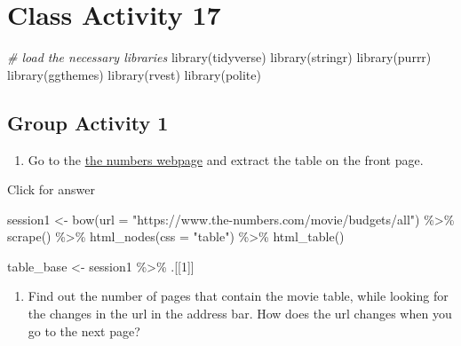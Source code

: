 \documentclass[
]{book}
\newenvironment{Shaded}{\begin{snugshade}}{\end{snugshade}}
\newcommand{\AttributeTok}[1]{\textcolor[rgb]{0.77,0.63,0.00}{#1}}
\newcommand{\CommentTok}[1]{\textcolor[rgb]{0.56,0.35,0.01}{\textit{#1}}}
\newcommand{\DecValTok}[1]{\textcolor[rgb]{0.00,0.00,0.81}{#1}}
\newcommand{\FunctionTok}[1]{\textcolor[rgb]{0.00,0.00,0.00}{#1}}
\newcommand{\NormalTok}[1]{#1}
\newcommand{\OtherTok}[1]{\textcolor[rgb]{0.56,0.35,0.01}{#1}}
\newcommand{\SpecialCharTok}[1]{\textcolor[rgb]{0.00,0.00,0.00}{#1}}
\newcommand{\StringTok}[1]{\textcolor[rgb]{0.31,0.60,0.02}{#1}}
\providecommand{\tightlist}{%
  \setlength{\itemsep}{0pt}\setlength{\parskip}{0pt}}
\begin{document}
\hypertarget{class-activity-17}{%
\chapter{Class Activity 17}\label{class-activity-17}}

\begin{Shaded}
\begin{Highlighting}[]
\CommentTok{\# load the necessary libraries}
\FunctionTok{library}\NormalTok{(tidyverse)}
\FunctionTok{library}\NormalTok{(stringr)}
\FunctionTok{library}\NormalTok{(purrr)}
\FunctionTok{library}\NormalTok{(ggthemes)}
\FunctionTok{library}\NormalTok{(rvest)}
\FunctionTok{library}\NormalTok{(polite)}
\end{Highlighting}
\end{Shaded}

\hypertarget{group-activity-1-4}{%
\section{Group Activity 1}\label{group-activity-1-4}}

\begin{enumerate}
\def\labelenumi{\arabic{enumi}.}
\tightlist
\item
  Go to the \href{https://www.the-numbers.com/movie/budgets/all}{the numbers webpage} and extract the table on the front page.
\end{enumerate}

Click for answer

\begin{Shaded}
\begin{Highlighting}[]
\NormalTok{session1 }\OtherTok{\textless{}{-}} \FunctionTok{bow}\NormalTok{(}\AttributeTok{url =} \StringTok{"https://www.the{-}numbers.com/movie/budgets/all"}\NormalTok{) }\SpecialCharTok{\%\textgreater{}\%} \FunctionTok{scrape}\NormalTok{() }\SpecialCharTok{\%\textgreater{}\%}
  \FunctionTok{html\_nodes}\NormalTok{(}\AttributeTok{css =} \StringTok{"table"}\NormalTok{) }\SpecialCharTok{\%\textgreater{}\%}
  \FunctionTok{html\_table}\NormalTok{()}

\NormalTok{table\_base }\OtherTok{\textless{}{-}}\NormalTok{ session1 }\SpecialCharTok{\%\textgreater{}\%}\NormalTok{ .[[}\DecValTok{1}\NormalTok{]]}
\end{Highlighting}
\end{Shaded}

\begin{enumerate}
\def\labelenumi{\arabic{enumi}.}
\setcounter{enumi}{1}
\tightlist
\item
  Find out the number of pages that contain the movie table, while looking for the changes in the url in the address bar. How does the url changes when you go to the next page?
\end{enumerate}
\end{document}
